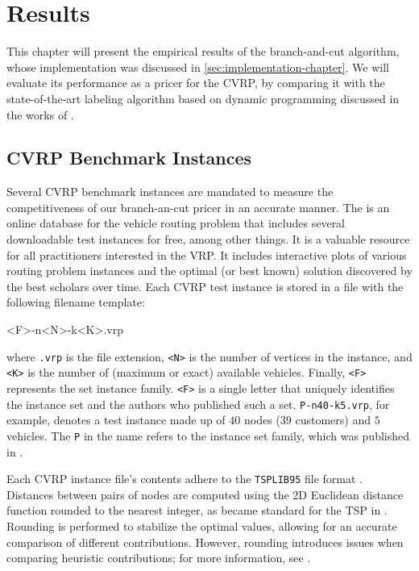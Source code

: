 \chapter{Results}
\label{sec:results}

This chapter will present the empirical results
of the branch-and-cut algorithm,
whose implementation was discussed in \cref{sec:implementation-chapter}.
We will evaluate its performance as a pricer for the CVRP,
by comparing it with
the state-of-the-art labeling algorithm based on dynamic programming
discussed in the works of \textcite{pessoa2020generic, sadykov2021bucket}.

\medskip

\section{CVRP Benchmark Instances}
\label{sec:results-benchmark-instances}

Several CVRP benchmark instances are mandated to measure the competitiveness
of our branch-an-cut pricer in an accurate manner.
The 
is an online database for the vehicle routing problem that includes
several downloadable test instances for free, among other things.
It is a valuable resource for all practitioners interested in the VRP.
It includes interactive plots of various routing problem instances
and the optimal (or best known) solution discovered by the best scholars over time.
Each CVRP test instance is stored in a file with the following filename template:
\begin{center}
	\begin{LVerbatim}
		<F>-n<N>-k<K>.vrp
	\end{LVerbatim}
\end{center}
where \texttt{.vrp} is the file extension,
\texttt{<N>} is the number of vertices in the instance, and
\texttt{<K>} is the number of (maximum or exact) available vehicles.
Finally, \texttt{<F>} represents the set instance family.
\texttt{<F>} is a single letter that uniquely identifies the instance
set and the authors who published such a set.
\texttt{P-n40-k5.vrp}, for example, denotes a test instance made up
of $40$ nodes ($39$ customers) and $5$ vehicles.
The \texttt{P} in the name refers to the instance set family,
which was published in \textcite{augerat1995}.

Each CVRP instance file's contents adhere
to the \texttt{TSPLIB95} file format \parencite{reinelt1995}.
Distances between pairs of nodes are computed
using the 2D Euclidean distance function rounded to the nearest integer,
as became standard for the TSP in \textcite{reinelt1991}.
Rounding is performed to stabilize the optimal values,
allowing for an accurate comparison of different contributions.
However, rounding introduces issues when comparing heuristic contributions;
for more information, see \textcite{uchoa2017}.

